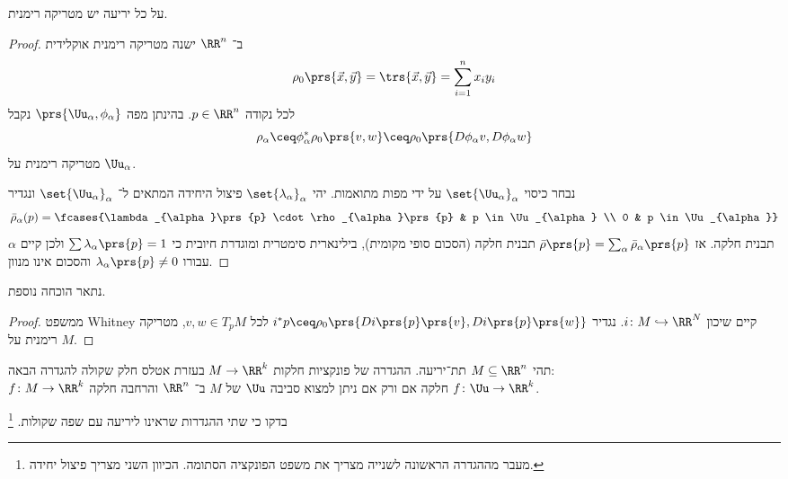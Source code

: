 \documentclass[a4paper,10pt,twoside,openany]{book}
\begin{document}
\begin{theorem}
על כל יריעה יש מטריקה רימנית.
\end{theorem}
\begin{proof}
ב־%
$\RR^n$
ישנה מטריקה רימנית אוקלידית
\[\rho_0\prs{\vec{x},\vec{y}} = \trs{\vec{x},\vec{y}} = \sum_{i=1}^n x_i y_i\]
לכל נקודה
$p \in \RR^n$.
בהינתן מפה
$\prs{\Uu_{\alpha}, \phi_{\alpha}}$
נקבל
\[\rho_{\alpha} \ceq \phi_{\alpha}^* \rho_0 \prs{v, w} \ceq \rho_0 \prs{D \phi_{\alpha} v, D\phi_{\alpha} w}\]
מטריקה רימנית על
$\Uu_{\alpha}$.

נבחר כיסוי
$\set{\Uu_{\alpha}}_{\alpha}$
על ידי מפות מתואמות.
יהי
$\set{\lambda_{\alpha}}_{\alpha}$
פיצול היחידה המתאים ל־%
$\set{\Uu_{\alpha}}_{\alpha}$
ונגדיר
\[\bar{\rho}_{\alpha}(p) = \fcases{\lambda_{\alpha}\prs{p} \cdot \rho_{\alpha}\prs{p} & p \in \Uu_{\alpha} \\ 0 & p \in \Uu_{\alpha}}\]
תבנית חלקה.
אז
$\bar{\rho}\prs{p} = \sum_{\alpha} \bar{\rho}_{\alpha}\prs{p}$
תבנית חלקה (הסכום סופי מקומית), בילינארית סימטרית ומוגדרת חיובית כי
$\sum \lambda_{\alpha}\prs{p} = 1$
ולכן קיים
$\alpha$
עבורו
$\lambda_{\alpha}\prs{p} \neq 0$
והסכום אינו מנוון.
\end{proof}

נתאר הוכחה נוספת.

\begin{proof}
ממשפט
\textenglish{Whitney}
קיים שיכון
$i \colon M \hookrightarrow \RR^N$.
נגדיר
$i^* p \ceq \rho_0 \prs{Di\prs{p}\prs{v},Di\prs{p}\prs{w}}$
לכל
$v,w \in T_p M$,
מטריקה רימנית על
$M$.
\end{proof}
\begin{exercise}
תהי
$M \subseteq \RR^n$
תת־יריעה. ההגדרה של פונקציות חלקות
$M \to \RR^k$
בעזרת אטלס חלק שקולה להגדרה הבאה:
\\
$f \colon M \to \RR^k$
חלקה אם ורק אם ניתן למצוא סביבה
$\Uu$
של
$M$
ב־%
$\RR^n$
והרחבה חלקה
$f \colon \Uu \to \RR^k$.
\end{exercise}
\begin{exercise}
בדקו כי שתי ההגדרות שראינו ליריעה עם שפה שקולות.%
\footnote{מעבר מההגדרה הראשונה לשנייה מצריך את משפט הפונקציה הסתומה. הכיוון השני מצריך פיצול יחידה.}
\end{exercise}
\backmatter
\end{document}
